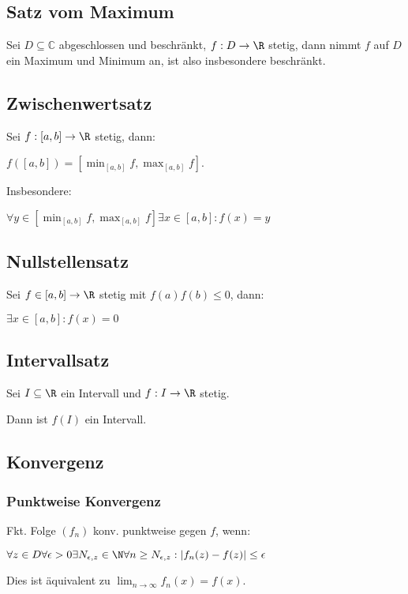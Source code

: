 \subsection*{Satz vom Maximum}

Sei $D \subseteq \mathbb{C}$ abgeschlossen und beschränkt, $f: D \rightarrow \R$ stetig, dann nimmt $f$ auf $D$ ein Maximum und Minimum an, ist also insbesondere beschränkt.

\subsection*{Zwischenwertsatz}

Sei $f: [a, b] \rightarrow \R$ stetig, dann:

$f([a, b]) = [\min_{[a, b]} f, \max_{[a, b]} f]$.

Insbesondere:

$\forall y \in [\min_{[a, b]} f, \max_{[a, b]} f] \exists x \in [a, b]: f(x)=y$

\subsection*{Nullstellensatz}

Sei $f \in [a, b] \rightarrow \R$ stetig mit $f(a)f(b) \leq 0$, dann:

$\exists x \in [a, b]: f(x) = 0$

\subsection*{Intervallsatz}

Sei $I \subseteq \R$ ein Intervall und $f : I \rightarrow \R$ stetig.

Dann ist $f(I)$ ein Intervall.

\subsection*{Konvergenz}

\subsubsection*{Punktweise Konvergenz}

Fkt. Folge $(f_n)$ konv. punktweise gegen $f$, wenn:

$\forall z \in D \forall \epsilon > 0 \exists N_{\epsilon, z} \in \N \forall n \geq N_{\epsilon, z} : | f_n(z) - f(z) | \leq \epsilon$

Dies ist äquivalent zu $\lim_{n\to \infty} f_n(x)=f(x)$.

